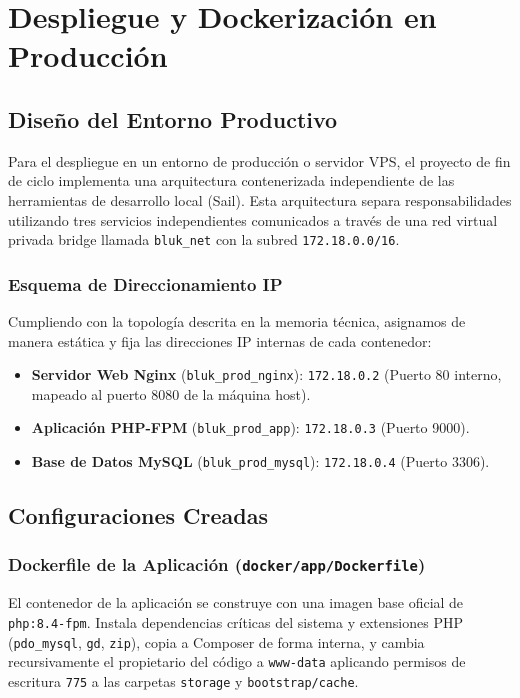 \chapter{Despliegue y Dockerización en Producción}

\section{Diseño del Entorno Productivo}
Para el despliegue en un entorno de producción o servidor VPS, el proyecto de fin de ciclo implementa una arquitectura contenerizada independiente de las herramientas de desarrollo local (Sail). Esta arquitectura separa responsabilidades utilizando tres servicios independientes comunicados a través de una red virtual privada bridge llamada \texttt{bluk\_net} con la subred \texttt{172.18.0.0/16}.

\subsection{Esquema de Direccionamiento IP}
Cumpliendo con la topología descrita en la memoria técnica, asignamos de manera estática y fija las direcciones IP internas de cada contenedor:
\begin{itemize}
    \item \textbf{Servidor Web Nginx} (\texttt{bluk\_prod\_nginx}): \texttt{172.18.0.2} (Puerto 80 interno, mapeado al puerto 8080 de la máquina host).
    \item \textbf{Aplicación PHP-FPM} (\texttt{bluk\_prod\_app}): \texttt{172.18.0.3} (Puerto 9000).
    \item \textbf{Base de Datos MySQL} (\texttt{bluk\_prod\_mysql}): \texttt{172.18.0.4} (Puerto 3306).
\end{itemize}

\section{Configuraciones Creadas}

\subsection{Dockerfile de la Aplicación (\texttt{docker/app/Dockerfile})}
El contenedor de la aplicación se construye con una imagen base oficial de \texttt{php:8.4-fpm}. Instala dependencias críticas del sistema y extensiones PHP (\texttt{pdo\_mysql}, \texttt{gd}, \texttt{zip}), copia a Composer de forma interna, y cambia recursivamente el propietario del código a \texttt{www-data} aplicando permisos de escritura \texttt{775} a las carpetas \texttt{storage} y \texttt{bootstrap/cache}.

